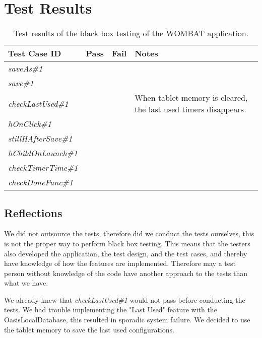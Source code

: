 \clearpage
\section{Test Results}
	
	\begin{table}[width=\textwidth]
		\begin{center}
			\begin{tabular}{|l|c|c|p{6cm}|}
				\hline
				\textbf{Test Case ID} & \textbf{Pass} & \textbf{Fail} & \textbf{Notes} \\
				\hline
				\textit{saveAs\#1} & \checkmark &  &  \\
				\hline
				\textit{save\#1} & \checkmark &  &  \\
				\hline
				\textit{checkLastUsed\#1} &  & \checkmark & When tablet memory is cleared, the last used timers disappears. \\
				\hline
				\textit{hOnClick\#1} & \checkmark &  &  \\
				\hline
				\textit{stillHAfterSave\#1} & \checkmark &  &  \\
				\hline
				\textit{hChildOnLaunch\#1} & \checkmark &  &  \\
				\hline
				\textit{checkTimerTime\#1} & \checkmark &  &  \\
				\hline
				\textit{checkDoneFunc\#1} & \checkmark &  &  \\
				\hline
			\end{tabular}
			\caption{Test results of the black box testing of the WOMBAT application.}
			\label{tab:bb_test_results}
		\end{center}
	\end{table}

\subsection{Reflections}
We did not outsource the tests, therefore did we conduct the tests ourselves, this is not the proper way to perform black box testing. 
This means that the testers also developed the application, the test design, and the test cases, and thereby have knowledge of how the features are implemented.
Therefore may a test person without knowledge of the code have another approach to the tests than what we have.

We already knew that \textit{checkLastUsed\#1} would not pass before conducting the tests. 
We had trouble implementing the "Last Used" feature with the OasisLocalDatabase, this resulted in sporadic system failure.
We decided to use the tablet memory to save the last used configurations.